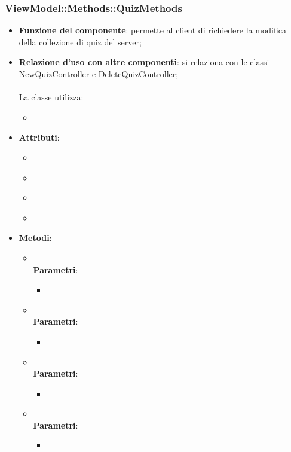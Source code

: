 \subsubsection{ViewModel::Methods::QuizMethods}
\begin{itemize}
\item\textbf{Funzione del componente}: permette al client di richiedere la modifica della collezione di quiz del server;
	\item\textbf{Relazione d'uso con altre componenti}: si relaziona con le classi NewQuizController e DeleteQuizController;\\ \\
La classe utilizza:
	\begin{itemize}
		\item
	\end{itemize}
\item\textbf{Attributi}:
	\begin{itemize}
		\item\code{}\\
		\item\code{}\\
		\item\code{}\\
		\item\code{}\\
	\end{itemize}
\item\textbf{Metodi}:
	\begin{itemize}
		\item\code{}\\
		\textbf{Parametri}:
			\begin{itemize}
				\item\code{}\\
			\end{itemize}
		\item\code{}\\
		\textbf{Parametri}:
			\begin{itemize}
				\item\code{}\\
			\end{itemize}
		\item\code{}\\
		\textbf{Parametri}:
			\begin{itemize}
				\item\code{}\\
			\end{itemize}
		\item\code{}\\
		\textbf{Parametri}:
			\begin{itemize}
				\item\code{}\\
			\end{itemize}
	\end{itemize}
\end{itemize}

